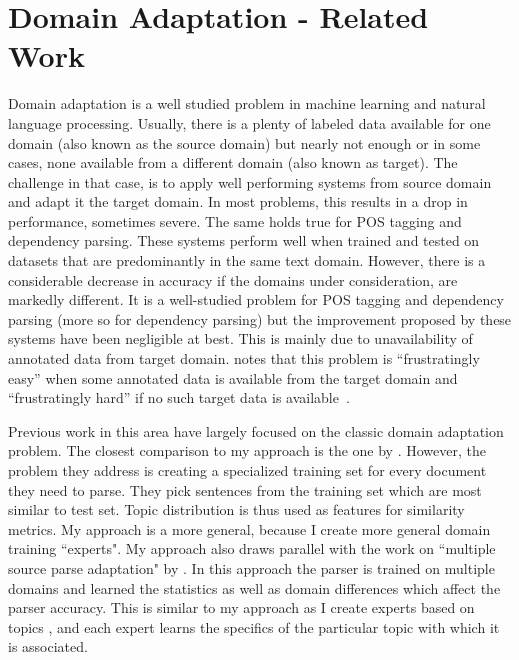 \chapter{Domain Adaptation - Related Work}

Domain adaptation is a well studied problem in machine learning and natural language processing. Usually, there is a plenty of labeled data available for one domain (also known as the source domain) but nearly not enough or in some cases, none available from a different domain (also known as target). The challenge in that case, is to apply well performing systems from source domain and adapt it the target domain. In most problems, this results in a drop in performance, sometimes severe. The same holds true for POS tagging and dependency parsing. These systems perform well when trained and tested on datasets that are predominantly in the same text domain. However, there is a considerable decrease in accuracy if the domains under consideration, are markedly different. It is a well-studied problem for POS tagging and dependency parsing (more so for dependency parsing) but the improvement proposed by these systems have been negligible at best. This is mainly due to unavailability of annotated data from target domain. \cite{daume:07} notes that this problem is ``frustratingly easy'' when some annotated data  is available from the target domain  and ``frustratingly hard'' if no such target data is available~\citep{dredze:blitzer:ea:07}. 

Previous work in this area have largely focused on the classic domain adaptation problem. The closest comparison to my approach is the one by \cite{plank2011effective}. However, the problem they address is creating a specialized training set for every document they need to parse. They pick sentences from the training set which are most similar to test set. Topic distribution is thus used as features for similarity metrics. My approach is a more general, because I create more general domain training ``experts". My approach also draws parallel with the work on ``multiple source parse adaptation" by \cite{mcclosky2010automatic}. In this approach the parser is trained on multiple domains and learned the statistics as well as  domain differences which affect the parser accuracy. This is similar to my approach as I create experts based on topics , and each expert learns the specifics of the particular topic with which it is associated.
